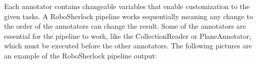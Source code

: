 \documentclass[main.tex]{subfiles}
\begin{document}
Each annotator contains changeable variables that enable customization to the given tasks.
A RoboSherlock pipeline works sequentially meaning any change to the order of the annotators can change the result. Some of the annotators are essential for the pipeline to work, like the CollectionReader or PlaneAnnotator, which must be executed before the other annotators. 
The following pictures are an example of the RoboSherlock pipeline output:  \\

\begin{figure}[H]
     \begin{center}
%
        \\ %
\end{center}
\end{figure}
\end{document}
